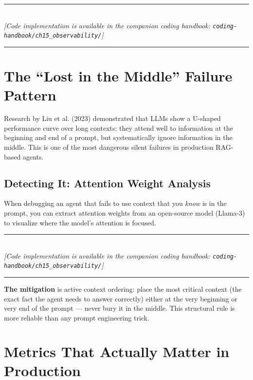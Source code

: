 \begin{center}
\noindent\rule{0.6\textwidth}{0.4pt} \\
\vspace{0.3em}
\textit{[Code implementation is available in the companion coding handbook: \texttt{coding-handbook/ch15\_observability/}]} \\
\noindent\rule{0.6\textwidth}{0.4pt}
\end{center}


\section{The ``Lost in the Middle'' Failure Pattern}

Research by Liu et al. (2023) demonstrated that LLMs show a U-shaped performance curve over long contexts: they attend well to information at the beginning and end of a prompt, but systematically ignore information in the middle. This is one of the most dangerous silent failures in production RAG-based agents.

\subsection{Detecting It: Attention Weight Analysis}
When debugging an agent that fails to use context that you \textit{know} is in the prompt, you can extract attention weights from an open-source model (Llama-3) to visualize where the model's attention is focused.


\begin{center}
\noindent\rule{0.6\textwidth}{0.4pt} \\
\vspace{0.3em}
\textit{[Code implementation is available in the companion coding handbook: \texttt{coding-handbook/ch15\_observability/}]} \\
\noindent\rule{0.6\textwidth}{0.4pt}
\end{center}


\textbf{The mitigation} is active context ordering: place the most critical context (the exact fact the agent needs to answer correctly) either at the very beginning or very end of the prompt — never bury it in the middle. This structural rule is more reliable than any prompt engineering trick.

\section{Metrics That Actually Matter in Production}


